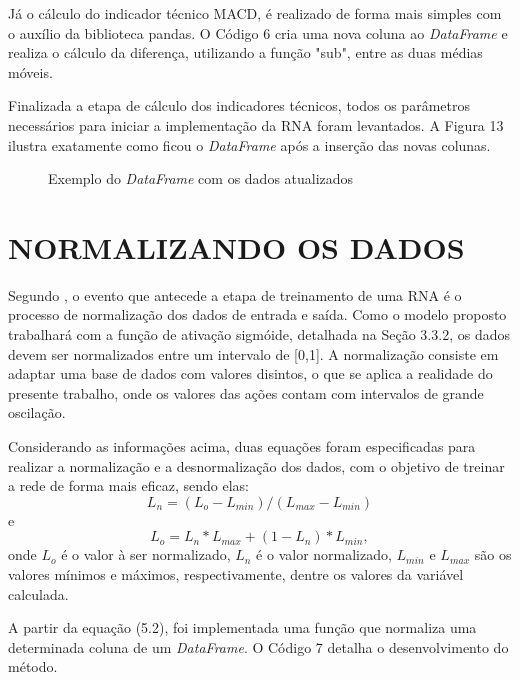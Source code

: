 Já o cálculo do indicador técnico MACD, é realizado de forma mais simples com o auxílio da biblioteca pandas. O Código 6 cria uma nova coluna ao \textit{DataFrame} e realiza o cálculo da diferença, utilizando a função "sub", entre as duas médias móveis.


Finalizada a etapa de cálculo dos indicadores técnicos, todos os parâmetros necessários para iniciar a implementação da RNA foram levantados. A Figura 13 ilustra exatamente como ficou o \textit{DataFrame} após a inserção das novas colunas.
\begin{figure}[h]
	\centering
	\caption{Exemplo do \textit{DataFrame} com os dados atualizados}
	\label{exec-dados-formatados}
\end{figure}

\section{NORMALIZANDO OS DADOS}
Segundo , o evento que antecede a etapa de treinamento de uma RNA é o processo de normalização dos dados de entrada e saída. Como o modelo proposto trabalhará com a função de ativação sigmóide, detalhada na Seção 3.3.2, os dados devem ser normalizados entre um intervalo de [0,1]. A normalização consiste em adaptar uma base de dados com valores disintos, o que se aplica a realidade do presente trabalho, onde os valores das ações contam com intervalos de grande oscilação.

Considerando as informações acima, duas equações foram especificadas para realizar a normalização e a desnormalização dos dados, com o objetivo de treinar a rede de forma mais eficaz, sendo elas:
\begin{equation}\label{eq:eq-normalizacao}
L_n = (L_o - L_{min}) / (L_{max} - L_{min})
\end{equation}
e
\begin{equation}\label{eq:eq-desnormalizacao}
L_o =  L_n * L_{max} + (1 - L_n) * L_{min},
\end{equation}
onde $L_o$ é o valor à ser normalizado, $L_n$ é o valor normalizado, $L_{min}$ e $L_{max}$ são os valores mínimos e máximos, respectivamente, dentre os valores da variável calculada.

A partir da equação (5.2), foi implementada uma função que normaliza uma determinada coluna de um \textit{DataFrame}. O Código 7 detalha o desenvolvimento do método.


